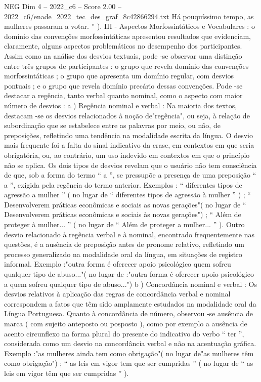 \begin{textsample}{NEG Dim 4 – 2022\_c6 – Score 2.00 – 2022\_c6/enade\_2022\_tec\_des\_graf\_8c42866294.txt}
Há pouquíssimo tempo, as mulheres passaram a votar. ” ).
III - Aspectos Morfossintáticos e Vocabulares : o domínio das convenções morfossintáticas apresentou resultados que evidenciam, claramente, alguns aspectos problemáticos no desempenho dos participantes.
Assim como na análise dos desvios textuais, pode -se observar uma distinção entre três grupos de participantes : o grupo que revela domínio das convenções morfossintáticas ; o grupo que apresenta um domínio regular, com desvios pontuais ; e o grupo que revela domínio precário dessas convenções.
Pode -se destacar a regência, tanto verbal quanto nominal, como o aspecto com maior número de desvios : a ) Regência nominal e verbal : Na maioria dos textos, destacam -se os desvios relacionados à noção de"regência", ou seja, à relação de subordinação que se estabelece entre as palavras por meio, ou não, de preposições, refletindo uma tendência na modalidade escrita da língua.
O desvio mais frequente foi a falta do sinal indicativo da crase, em contextos em que seria obrigatória, ou, ao contrário, um uso indevido em contextos em que o princípio não se aplica.
Os dois tipos de desvios revelam que o usuário não tem consciência de que, sob a forma do termo “ a ”, se pressupõe a presença de uma preposição “ a ”, exigida pela regência do termo anterior.
Exemplos : “ diferentes tipos de agressão a mulher ” ( no lugar de “ diferentes tipos de agressão à mulher ” ) ; “ Desenvolverem práticas econômicas e sociais as novas gerações"( no lugar de “ Desenvolverem práticas econômicas e sociais às novas gerações") ; “ Além de proteger à mulher... ” ( no lugar de “ Além de proteger a mulher... ” ).
Outro desvio relacionado à regência verbal e à nominal, encontrado frequentemente nas questões, é a ausência de preposição antes de pronome relativo, refletindo um processo generalizado na modalidade oral da língua, em situações de registro informal.
Exemplo :"outra forma é oferecer apoio psicológico quem sofreu qualquer tipo de abuso..."( no lugar de :"outra forma é oferecer apoio psicológico a quem sofreu qualquer tipo de abuso...") b ) Concordância nominal e verbal : Os desvios relativos à aplicação das regras de concordância verbal e nominal correspondem a fatos que têm sido amplamente estudados na modalidade oral da Língua Portuguesa.
Quanto à concordância de número, observou -se ausência de marca ( com sujeito anteposto ou posposto ), como por exemplo a ausência de acento circunflexo na forma plural do presente do indicativo do verbo “ ter ”, considerada como um desvio na concordância verbal e não na acentuação gráfica.
Exemplo :"as mulheres ainda tem como obrigação"( no lugar de"as mulheres têm como obrigação") ; “ as leis em vigor tem que ser cumpridas ” ( no lugar de “ as leis em vigor têm que ser cumpridas ” ).

\end{textsample}
